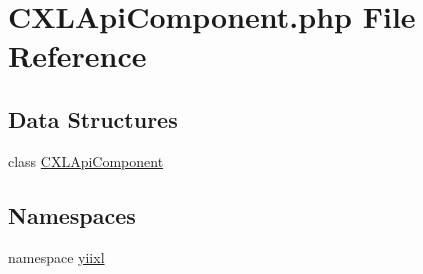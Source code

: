 \hypertarget{CXLApiComponent_8php}{
\section{CXLApiComponent.php File Reference}
\label{CXLApiComponent_8php}
}
\subsection*{Data Structures}
\begin{DoxyCompactItemize}
\item 
class \hyperlink{classCXLApiComponent}{CXLApiComponent}
\end{DoxyCompactItemize}
\subsection*{Namespaces}
\begin{DoxyCompactItemize}
\item 
namespace \hyperlink{namespaceyiixl}{yiixl}
\end{DoxyCompactItemize}

